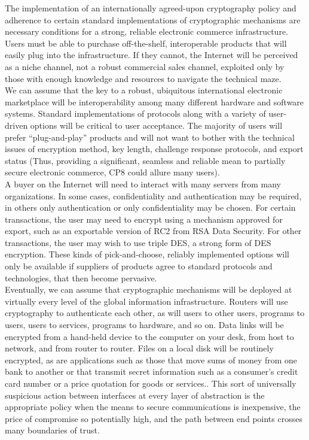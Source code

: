 The implementation of an internationally agreed-upon cryptography
policy and adherence to certain standard implementations of
cryptographic mechanisms are necessary conditions for a strong,
reliable electronic commerce infrastructure. Users must be able to
purchase off-the-shelf, interoperable products that will easily plug
into the infrastructure. If they cannot, the Internet will be perceived
as a niche channel, not a robust commercial sales channel, exploited
only by those with enough knowledge and resources to navigate the
technical maze.\\

We can assume that the key to a robust, ubiquitous international
electronic marketplace will be interoperability among many different
hardware and software systems. Standard implementations of protocols
along with a variety of user-driven options will be critical to user
acceptance. The majority of users will prefer ``plug-and-play''
products and will not want to bother with the technical issues of
encryption method, key length, challenge response protocols, and export
status (Thus, providing a significant, seamless and reliable mean to
partially secure electronic commerce, CP8 could allure many users).\\

A buyer on the Internet will need to interact with many servers from
many organizations. In some cases, confidentiality and authentication
may be required, in others only authentication or only confidentiality
may be chosen. For certain transactions, the user may need to encrypt
using a mechanism approved for export, such as an exportable version of
RC2 from RSA Data Security. For other transactions, the user may wish
to use triple DES, a strong form of DES encryption. These kinds of
pick-and-choose, reliably implemented options will only be available if
suppliers of products agree to standard protocols and technologies,
that then become pervasive.\\

Eventually, we can assume that cryptographic mechanisms will be
deployed at virtually every level of the global information
infrastructure. Routers will use cryptography to authenticate each
other, as will users to other users, programs to users, users to
services, programs to hardware, and so on. Data links will be encrypted
from a hand-held device to the computer on your desk, from host to
network, and from router to router. Files on a local disk will be
routinely encrypted, as are applications such as those that move sums
of money from one bank to another or that transmit secret information
such as a consumer's credit card number or a price quotation for goods
or services.. This sort of universally suspicious action between
interfaces at every layer of abstraction is the appropriate policy when
the means to secure communications is inexpensive, the price of
compromise so potentially high, and the path between end points crosses
many boundaries of trust.\\


